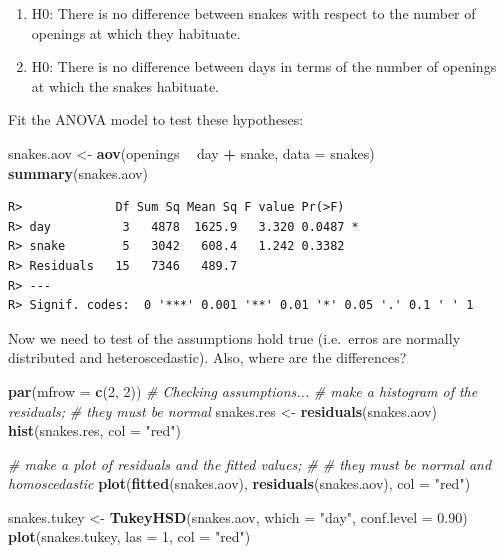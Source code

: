 \documentclass[english,10pt,a4paper,oneside]{book}
\providecommand{\tightlist}{%
  \setlength{\itemsep}{0pt}\setlength{\parskip}{0pt}}
\newenvironment{Shaded}{\begin{snugshade}}{\end{snugshade}}
\newcommand{\KeywordTok}[1]{\textcolor[rgb]{0.13,0.29,0.53}{\textbf{#1}}}
\newcommand{\DataTypeTok}[1]{\textcolor[rgb]{0.13,0.29,0.53}{#1}}
\newcommand{\DecValTok}[1]{\textcolor[rgb]{0.00,0.00,0.81}{#1}}
\newcommand{\FloatTok}[1]{\textcolor[rgb]{0.00,0.00,0.81}{#1}}
\newcommand{\StringTok}[1]{\textcolor[rgb]{0.31,0.60,0.02}{#1}}
\newcommand{\CommentTok}[1]{\textcolor[rgb]{0.56,0.35,0.01}{\textit{#1}}}
\newcommand{\OperatorTok}[1]{\textcolor[rgb]{0.81,0.36,0.00}{\textbf{#1}}}
\newcommand{\NormalTok}[1]{#1}
\theoremstyle{definition}
\theoremstyle{definition}
\theoremstyle{definition}
\theoremstyle{remark}
\begin{document}
\begin{enumerate}
\def\labelenumi{\arabic{enumi}.}
\tightlist
\item
  H0: There is no difference between snakes with respect to the number
  of openings at which they habituate.
\item
  H0: There is no difference between days in terms of the number of
  openings at which the snakes habituate.
\end{enumerate}

Fit the ANOVA model to test these hypotheses:

\begin{Shaded}
\begin{Highlighting}[]
\NormalTok{snakes.aov <-}\StringTok{ }\KeywordTok{aov}\NormalTok{(openings }\OperatorTok{~}\StringTok{ }\NormalTok{day }\OperatorTok{+}\StringTok{ }\NormalTok{snake, }\DataTypeTok{data =}\NormalTok{ snakes)}
\KeywordTok{summary}\NormalTok{(snakes.aov)}
\end{Highlighting}
\end{Shaded}

\begin{verbatim}
R>             Df Sum Sq Mean Sq F value Pr(>F)  
R> day          3   4878  1625.9   3.320 0.0487 *
R> snake        5   3042   608.4   1.242 0.3382  
R> Residuals   15   7346   489.7                 
R> ---
R> Signif. codes:  0 '***' 0.001 '**' 0.01 '*' 0.05 '.' 0.1 ' ' 1
\end{verbatim}

Now we need to test of the assumptions hold true (i.e.~erros are
normally distributed and heteroscedastic). Also, where are the
differences?

\begin{Shaded}
\begin{Highlighting}[]
\KeywordTok{par}\NormalTok{(}\DataTypeTok{mfrow =} \KeywordTok{c}\NormalTok{(}\DecValTok{2}\NormalTok{, }\DecValTok{2}\NormalTok{))}
\CommentTok{# Checking assumptions...}
\CommentTok{# make a histogram of the residuals;}
\CommentTok{# they must be normal}
\NormalTok{snakes.res <-}\StringTok{ }\KeywordTok{residuals}\NormalTok{(snakes.aov)}
\KeywordTok{hist}\NormalTok{(snakes.res, }\DataTypeTok{col =} \StringTok{"red"}\NormalTok{)}

\CommentTok{# make a plot of residuals and the fitted values;}
\CommentTok{# # they must be normal and homoscedastic}
\KeywordTok{plot}\NormalTok{(}\KeywordTok{fitted}\NormalTok{(snakes.aov), }\KeywordTok{residuals}\NormalTok{(snakes.aov), }\DataTypeTok{col =} \StringTok{"red"}\NormalTok{)}

\NormalTok{snakes.tukey <-}\StringTok{ }\KeywordTok{TukeyHSD}\NormalTok{(snakes.aov, }\DataTypeTok{which =} \StringTok{"day"}\NormalTok{, }\DataTypeTok{conf.level =} \FloatTok{0.90}\NormalTok{)}
\KeywordTok{plot}\NormalTok{(snakes.tukey, }\DataTypeTok{las =} \DecValTok{1}\NormalTok{, }\DataTypeTok{col =} \StringTok{"red"}\NormalTok{)}
\end{Highlighting}
\end{Shaded}
\end{document}

